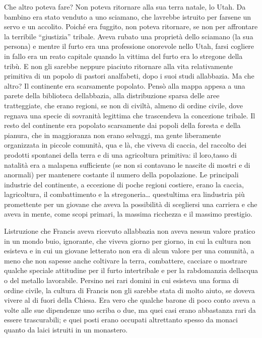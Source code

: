 Che altro poteva fare? Non poteva ritornare alla sua terra natale, lo
Utah. Da bambino era stato venduto a uno sciamano, che
l\textquotesingle avrebbe istruito per farsene un servo e un accolito.
Poiché era fuggito, non poteva ritornare, se non per affrontare la
terribile ``giustizia'' tribale. Aveva rubato una proprietà dello
sciamano (la sua persona) e mentre il furto era una professione
onorevole nello Utah, farsi cogliere in fallo era un reato capitale
quando la vittima del furto era lo stregone della tribù. E non gli
sarebbe neppure piaciuto ritornare alla vita relativamente primitiva di
un popolo di pastori analfabeti, dopo i suoi studi
all\textquotesingle abbazia. Ma che altro? Il continente era scarsamente
popolato. Pensò alla mappa appesa a una parete della biblioteca
dell\textquotesingle abbazia, alla distribuzione sparsa delle aree
tratteggiate, che erano regioni, se non di civiltà, almeno di ordine
civile, dove regnava una specie di sovranità legittima che trascendeva
la concezione tribale. Il resto del continente era popolato scarsamente
dai popoli della foresta e della pianura, che in maggioranza non erano
selvaggi, ma gente liberamente organizzata in piccole comunità, qua e
là, che viveva di caccia, del raccolto dei prodotti spontanei della
terra e di una agricoltura primitiva: il loro,tasso di natalità era a
malapena sufficiente (se non si contavano le nascite di mostri e di
anormali) per mantenere costante il numero della popolazione. Le
principali industrie del continente, a eccezione di poche regioni
costiere, erano la caccia, l\textquotesingle agricoltura, il
combattimento e la stregoneria\ldots{} quest\textquotesingle ultima era
l\textquotesingle industria più promettente per un giovane che aveva la
possibilità di scegliersi una carriera e che aveva in mente, come scopi
primari, la massima ricchezza e il massimo prestigio.

L\textquotesingle istruzione che Francis aveva ricevuto
all\textquotesingle abbazia non aveva nessun valore pratico in un mondo
buio, ignorante, che viveva giorno per giorno, in cui la cultura non
esisteva e in cui un giovane letterato non era di alcun valore per una
comunità, a meno che non sapesse anche coltivare la terra, combattere,
cacciare o mostrare qualche speciale attitudine per il furto
intertribale e per la rabdomanzia dell\textquotesingle acqua o del
metallo lavorabile. Persino nei rari domini in cui esisteva una forma di
ordine civile, la cultura di Francis non gli sarebbe stata di molto
aiuto, se doveva vivere al di fuori della Chiesa. Era vero che qualche
barone di poco conto aveva a volte alle sue dipendenze uno scriba o due,
ma quei casi erano abbastanza rari da essere trascurabili; e quei posti
erano occupati altrettanto spesso da monaci quanto da laici istruiti in
un monastero.

